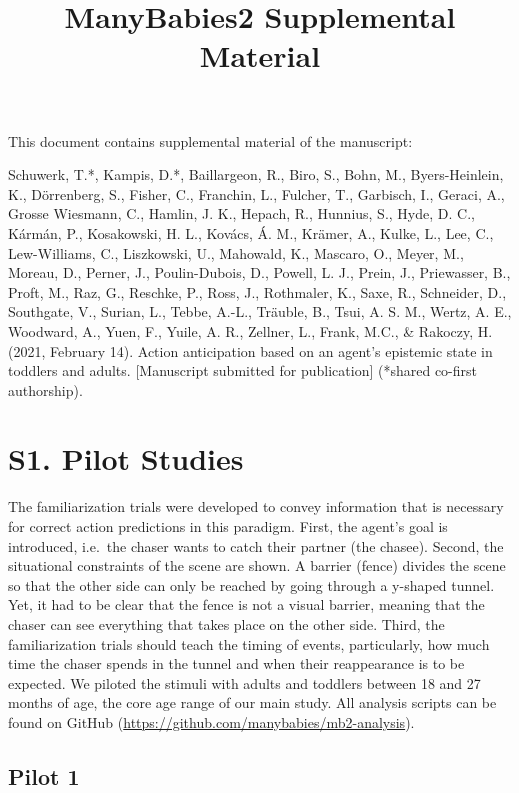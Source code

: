 \documentclass[
  english,
  man, donotrepeattitle,floatsintext]{apa6}
\title{ManyBabies2 Supplemental Material}
\author{\phantom{0}}
\date{}
\affiliation{\phantom{0}}
\begin{document}
\maketitle

This document contains supplemental material of the manuscript:

Schuwerk, T.*, Kampis, D.*, Baillargeon, R., Biro, S., Bohn, M., Byers-Heinlein, K., Dörrenberg, S., Fisher, C., Franchin, L., Fulcher, T., Garbisch, I., Geraci, A., Grosse Wiesmann, C., Hamlin, J. K., Hepach, R., Hunnius, S., Hyde, D. C., Kármán, P., Kosakowski, H. L., Kovács, Á. M., Krämer, A., Kulke, L., Lee, C., Lew-Williams, C., Liszkowski, U., Mahowald, K., Mascaro, O., Meyer, M., Moreau, D., Perner, J., Poulin-Dubois, D., Powell, L. J., Prein, J., Priewasser, B., Proft, M., Raz, G., Reschke, P., Ross, J., Rothmaler, K., Saxe, R., Schneider, D., Southgate, V., Surian, L., Tebbe, A.-L., Träuble, B., Tsui, A. S. M., Wertz, A. E., Woodward, A., Yuen, F., Yuile, A. R., Zellner, L., Frank, M.C., \& Rakoczy, H. (2021, February 14). Action anticipation based on an agent's epistemic state in toddlers and adults. {[}Manuscript submitted for publication{]} (*shared co-first authorship).

\hypertarget{s1.-pilot-studies}{%
\section{S1. Pilot Studies}\label{s1.-pilot-studies}}

The familiarization trials were developed to convey information that is necessary for correct action predictions in this paradigm. First, the agent's goal is introduced, i.e.~the chaser wants to catch their partner (the chasee). Second, the situational constraints of the scene are shown. A barrier (fence) divides the scene so that the other side can only be reached by going through a y-shaped tunnel. Yet, it had to be clear that the fence is not a visual barrier, meaning that the chaser can see everything that takes place on the other side. Third, the familiarization trials should teach the timing of events, particularly, how much time the chaser spends in the tunnel and when their reappearance is to be expected. We piloted the stimuli with adults and toddlers between 18 and 27 months of age, the core age range of our main study. All analysis scripts can be found on GitHub (\url{https://github.com/manybabies/mb2-analysis}).

\hypertarget{pilot-1}{%
\subsection{Pilot 1}\label{pilot-1}}
\end{document}
